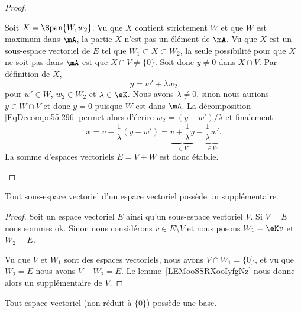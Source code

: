 \begin{proof}
\begin{subproof}
		Soit \( X=\Span\{ W,w_2 \}\). Vu que \( X\) contient strictement \( W\) et que \( W\) est maximum dans \( \mA\), la partie \( X\) n'est pas un élément de \( \mA\). Vu que \( X\) est un sous-espace vectoriel de \( E\) tel que \( W_1\subset X\subset W_2\), la seule possibilité pour que \( X\) ne soit pas dans \( \mA\) est que \( X\cap V\neq \{ 0 \}\). Soit donc \( y\neq 0\) dans \( X\cap V\). Par définition de \( X\),
		\begin{equation}\label{EqDecompo55:296}
			y=w'+\lambda w_2
		\end{equation}
		pour \( w'\in W\), \( w_2\in W_2\) et \( \lambda\in \eK\). Nous avons \( \lambda\neq 0\), sinon nous aurions \( y\in W\cap V \) et donc \(y = 0 \) puisque \( W \) est dans \( \mA \). La décomposition \eqref{EqDecompo55:296} permet alors d'écrire \( w_2=(y-w')/\lambda\) et finalement
		\begin{equation}
			x=v+\frac{1}{ \lambda }(y-w')=\underbrace{v+\frac{1}{ \lambda }y}_{\in V}-\underbrace{\frac{1}{ \lambda }w'}_{\in W}.
		\end{equation}
		La somme d'espaces vectoriels \( E=V+W\) est donc établie.
	\end{subproof}
\end{proof}

\begin{corollary}
	Tout sous-espace vectoriel d'un espace vectoriel possède un supplémentaire.
\end{corollary}

\begin{proof}
	Soit un espace vectoriel \( E\) ainsi qu'un sous-espace vectoriel \( V\). Si \( V=E\) nous sommes ok. Sinon nous considérons \( v\in E\setminus V\) et nous posons \( W_1=\eK v\) et \( W_2=E\).

	Vu que \( V\) et \( W_1\) sont des espaces vectoriels, nous avons \( V\cap W_1=\{ 0 \}\), et vu que \( W_2=E\) nous avons \( V+W_2=E\). Le lemme~\ref{LEMooSSRXooIyfgNz} nous donne alors un supplémentaire de \( V\).
\end{proof}

\begin{proposition}        \label{PROPooHDCEooMhDjPi}
	Tout espace vectoriel (non réduit à \( \{ 0 \}\)) possède une base.
\end{proposition}

